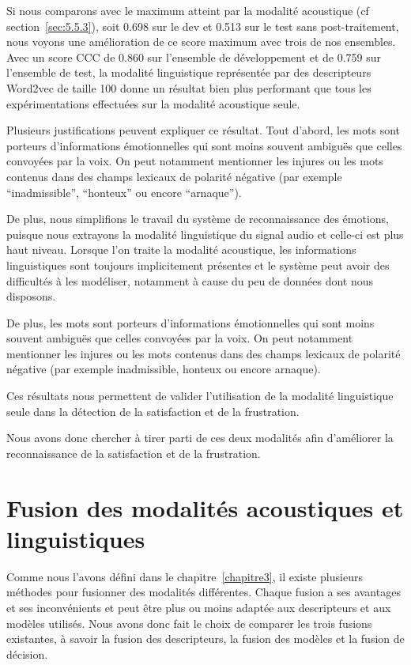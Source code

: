 Si nous comparons avec le maximum atteint par la modalité acoustique (cf section~\ref{sec:5.5.3}), soit 0.698 sur le dev et 0.513 sur le test sans post-traitement, nous voyons une amélioration de ce score maximum avec trois de nos ensembles. Avec un score CCC de 0.860 sur l'ensemble de développement et de 0.759 sur l'ensemble de test, la modalité linguistique représentée par des descripteurs Word2vec de taille 100 donne un résultat bien plus performant que tous les expérimentations effectuées sur la modalité acoustique seule.


Plusieurs justifications peuvent expliquer ce résultat. Tout d'abord, les mots sont porteurs d'informations émotionnelles qui sont moins souvent ambiguës que celles convoyées par la voix. On peut notamment mentionner les injures ou les mots contenus dans des champs lexicaux de polarité négative (par exemple ``inadmissible'', ``honteux'' ou encore ``arnaque'').

De plus, nous simplifions le travail du système de reconnaissance des émotions, puisque nous extrayons la modalité linguistique du signal audio et celle-ci est plus haut niveau. Lorsque l'on traite la modalité acoustique, les informations linguistiques sont toujours implicitement présentes et le système peut avoir des difficultés à les modéliser, notamment à cause du peu de données dont nous disposons.

De plus, les mots sont porteurs d'informations émotionnelles qui sont moins souvent ambiguës que celles convoyées par la voix. On peut notamment mentionner les injures ou les mots contenus dans des champs lexicaux de polarité négative (par exemple inadmissible, honteux ou encore arnaque).

Ces résultats nous permettent de valider l'utilisation de la modalité linguistique seule dans la détection de la satisfaction et de la frustration.

Nous avons donc chercher à tirer parti de ces deux modalités afin d'améliorer la reconnaissance de la satisfaction et de la frustration.

\section{Fusion des modalités acoustiques et linguistiques}
Comme nous l'avons défini dans le chapitre~\ref{chapitre3}, il existe plusieurs méthodes pour fusionner des modalités différentes. Chaque fusion a ses avantages et ses inconvénients et peut être plus ou moins adaptée aux descripteurs et aux modèles utilisés. Nous avons donc fait le choix de comparer les trois fusions existantes, à savoir la fusion des descripteurs, la fusion des modèles et la fusion de décision.

